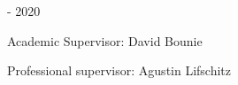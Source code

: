\begin{titlepage}
\begin{center}
		{\fontsize{18}{26} - 2020} \vspace{15mm}
		
		\begin{titlepagephantombox}
	
			\begin{center}
				
				{\fontsize{16}{26}\selectfont Academic Supervisor:}
				{\fontsize{16}{26}\selectfont David Bounie}
				
			\end{center}
			
			
		\end{titlepagephantombox} \hspace{15mm}	
		\begin{titlepagephantombox}
	
			\begin{center}
				
				{\fontsize{16}{26}\selectfont Professional supervisor:}
				{\fontsize{16}{26}\selectfont Agustin Lifschitz}
					
			\end{center}
			
		\end{titlepagephantombox}
	
	\end{center}
	
\end{titlepage}

\cleardoublepage